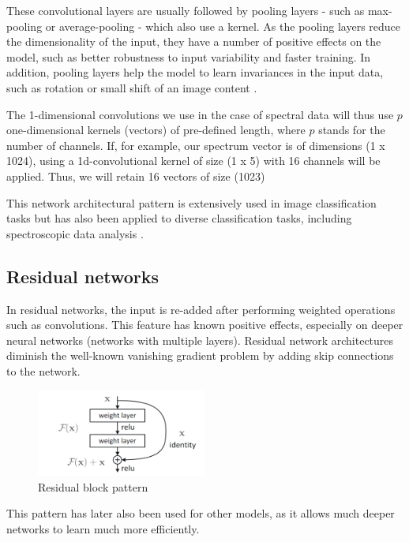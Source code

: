 These convolutional layers are usually followed by pooling layers - such as max-pooling or average-pooling - which also use a kernel. As the pooling layers reduce the dimensionality of the input, they have a number of positive effects on the model, such as better robustness to input variability and faster training. In addition, pooling layers help the model to learn invariances in the input data, such as rotation or small shift of an image content \cite{goodfellow_deep_2016}. 

The 1-dimensional convolutions we use in the case of spectral data will thus use $p$ one-dimensional kernels (vectors) of pre-defined length, where $p$ stands for the number of channels. If, for example, our spectrum vector is of dimensions (1 x 1024), using a 1d-convolutional kernel of size (1 x 5) with 16 channels will be applied. Thus, we will retain 16 vectors of size (1023)

This network architectural pattern is extensively used in image classification tasks but has also been applied to diverse classification tasks, including spectroscopic data analysis \cite{sun_cnnlstm_2023, castorena_deep_2021, drera_deep_2019}.

\subsection{Residual networks}

In residual networks, the input is re-added after performing weighted operations such as convolutions. This feature has known positive effects, especially on deeper neural networks (networks with multiple layers). Residual network architectures diminish the well-known vanishing gradient problem by adding skip connections to the network. 

\begin{figure}[H]
    \centering
    \includegraphics[width=0.5\textwidth]{Figures/ResBlockVariants.png}
    \caption{Residual block pattern}
    \label{fig:res_block}
\end{figure}

This pattern has later also been used for other models, as it allows much deeper networks to learn much more efficiently.

